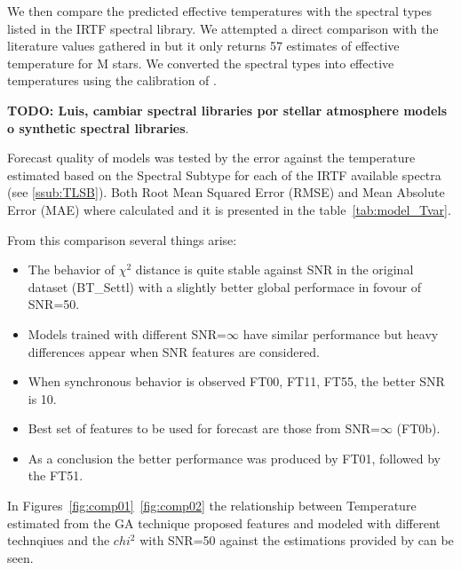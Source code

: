 
We then compare the predicted effective temperatures with the spectral
types listed in the IRTF spectral library. We attempted a direct
comparison with the literature values gathered in \cite{cesetti} but
it only returns 57 
estimates of effective temperature for M stars. We converted the
spectral types into effective temperatures using the calibration
of \cite{2009ApJ...702..154S}.

{\bf TODO: Luis, cambiar spectral libraries por stellar atmosphere
models o synthetic spectral libraries}.

Forecast quality of models was tested by the error against the
temperature estimated based on the Spectral Subtype for each of the
IRTF available spectra (see \ref{ssub:TLSB}).  Both Root Mean Squared
Error (RMSE) and Mean Absolute Error (MAE) where calculated and it is
presented in the table~\ref{tab:model_Tvar}.

From this comparison several things arise:
\begin{itemize}
 \item {The behavior of $\chi^2$ distance is quite stable against SNR 
	in the original dataset (BT\_Settl) with a slightly better global 
	performace in fovour of SNR=50.}
 \item {Models trained with different SNR=$\infty$ have similar performance but heavy 
	differences appear when SNR features are considered.}
 \item {When synchronous behavior is observed FT00, FT11, FT55, the better SNR is 10.}
 \item {Best set of features to be used for forecast are those from SNR=$\infty$ (FT0b).}
 \item {As a conclusion the better performance was produced by FT01, followed by the FT51.}
\end{itemize}

In Figures~\ref{fig:comp01}~\ref{fig:comp02} the relationship between Temperature
estimated from the GA technique proposed features and modeled with different 
technqiues and the $chi^2$ with SNR=50 against the 
estimations provided by \cite{cesetti} can be seen.

